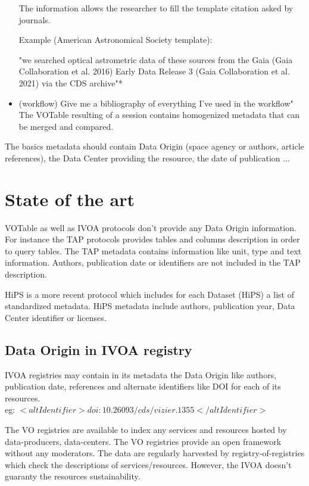 \documentclass[11pt,a4paper]{ivoa}
\begin{document}
\begin{itemize}
	The information allows the researcher to fill the template citation asked by journals.
	
	Example (American Astronomical Society template):
	
	"we searched optical astrometric data of these sources from the Gaia (Gaia Collaboration et al. 2016) Early Data Release 3 (Gaia Collaboration et al. 2021) via the CDS archive"*
	
	\item (workflow) Give me a bibliography of everything I've used in the workflow"
	The VOTable resulting of a session contains homogenized metadata that can be merged and compared.
	
\end{itemize}

The basics metadata should contain Data Origin (space agency or authors, article references), the Data Center providing the resource, the date of publication ...

\section{State of the art}

VOTable as well as IVOA protocols don't provide any Data Origin information. For instance the TAP protocols provides tables and columns description in order to query tables. The TAP metadata contains information like unit, type and text information. Authors, publication date or identifiers are not included in the TAP description.

HiPS is a more recent protocol which includes for each Dataset (HiPS) a list of standardized metadata. HiPS metadata include authors, publication year, Data Center identifier or licenses.


\subsection{Data Origin in IVOA registry}
IVOA registries may contain in its metadata the Data Origin like authors, publication date, references and alternate identifiers like DOI for each of its resources.\\
eg: $<altIdentifier>doi:10.26093/cds/vizier.1355</altIdentifier>$

The VO registries are available to index any services and resources hosted by data-producers, data-centers. 
The VO registries provide an open framework without any moderators. The data are regularly harvested by registry-of-registries which check the descriptions of services/resources. However, the IVOA  doesn't guaranty the resources sustainability.
\end{document}
